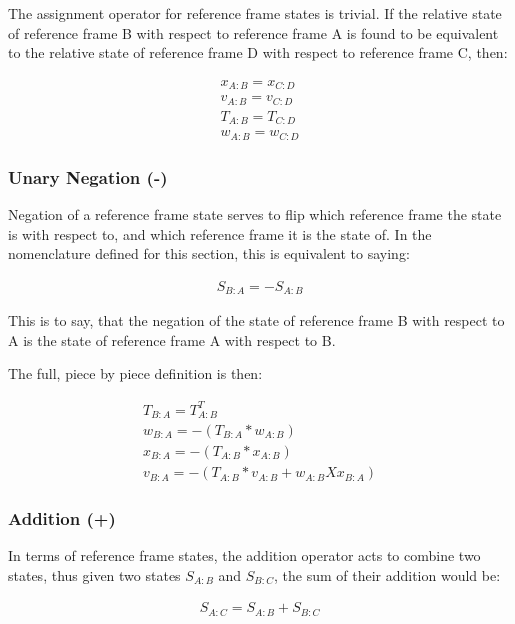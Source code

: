 The assignment operator for reference frame states is trivial. If the relative
state of reference frame B with respect to reference frame A is found to
be equivalent to the relative state of reference frame D with respect to
reference frame C, then:

\begin{gather}\label{assignment_eq}
x_{A:B} = x_{C:D} \\
v_{A:B} = v_{C:D} \\
T_{A:B} = T_{C:D} \\
w_{A:B} = w_{C:D}
\end{gather}

\subsubsection{Unary Negation (-)}

Negation of a reference frame state serves to flip which reference
frame the state is with respect to, and which reference frame it
is the state of. In the nomenclature defined for this section, this
is equivalent to saying:

\begin{gather}\label{simple_negation}
S_{B:A} = -S_{A:B}
\end{gather}

This is to say, that the negation of the state of reference frame B with
respect to A is the state of reference frame A with respect to B.

The full, piece by piece definition is then:

\begin{gather}\label{complete_negation}
T_{B:A} = T_{A:B}^T \\
w_{B:A} = -(T_{B:A} * w_{A:B}) \\
x_{B:A} = -(T_{A:B} * x_{A:B}) \\
v_{B:A} = -(T_{A:B} * v_{A:B} + w_{A:B} X x_{B:A})
\end{gather}

\subsubsection{Addition (+)}

In terms of reference frame states, the addition operator acts to
combine two states, thus given two states $S_{A:B}$ and $S_{B:C}$, the
sum of their addition would be:

\begin{gather}\label{simple_addition}
S_{A:C} = S_{A:B} + S_{B:C}
\end{gather}


